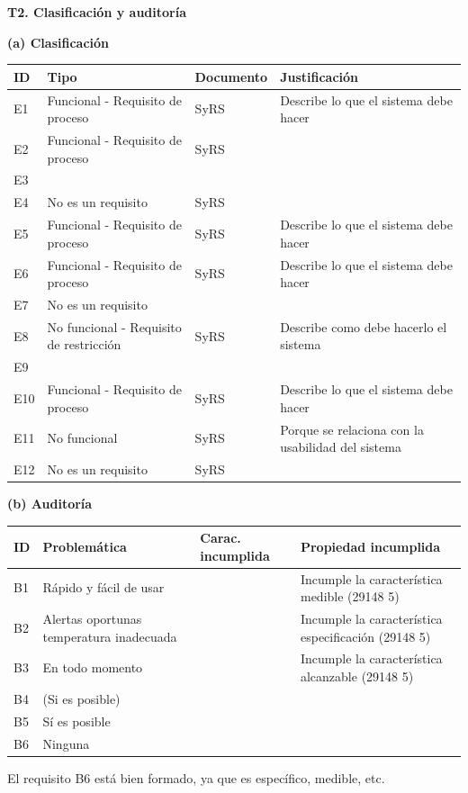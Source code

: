 \documentclass[11pt]{article}
\begin{document}
\begin{cajarespuesta}[title={Respuesta del estudiante: T2}]
	\textbf{T2. Clasificación y auditoría}

	\textbf{(a) Clasificación}

	\medskip
	\begin{tabular}{|l|p{3.9cm}|l|p{6.2cm}|}
	\hline
	ID & Tipo & Documento & Justificación \\
	\hline
	E1 & Funcional - Requisito de proceso & SyRS & Describe lo que el sistema debe hacer \\
	\hline
	E2 & Funcional - Requisito de proceso & SyRS & \\
	\hline
	E3 & & & \\
	\hline
	E4 & No es un requisito & SyRS & \\
	\hline
	E5 & Funcional - Requisito de proceso & SyRS & Describe lo que el sistema debe hacer \\
	\hline
	E6 & Funcional - Requisito de proceso & SyRS & Describe lo que el sistema debe hacer \\
	\hline
	E7 & No es un requisito & & \\
	\hline
	E8 & No funcional - Requisito de restricción & SyRS & Describe como debe hacerlo el sistema \\
	\hline
	E9 & & & \\
	\hline
	E10 & Funcional - Requisito de proceso & SyRS & Describe lo que el sistema debe hacer \\
	\hline
	E11 & No funcional & SyRS & Porque se relaciona con la usabilidad del sistema \\
	\hline
	E12 & No es un requisito & SyRS & \\
	\hline
	\end{tabular}

	\bigskip
	\textbf{(b) Auditoría}

	\medskip
	\begin{tabular}{|l|p{4.2cm}|p{2.2cm}|p{5.2cm}|}
	\hline
	ID & Problemática & Carac. incumplida & Propiedad incumplida \\
	\hline
	B1 & Rápido y fácil de usar & & Incumple la característica medible (29148 5) \\
	\hline
	B2 & Alertas oportunas temperatura inadecuada & & Incumple la característica especificación (29148 5) \\
	\hline
	B3 & En todo momento & & Incumple la característica alcanzable (29148 5) \\
	\hline
	B4 & (Si es posible) & & \\
	\hline
	B5 & Sí es posible & & \\
	\hline
	B6 & Ninguna & & \\
	\hline
	\end{tabular}

	\medskip
	El requisito B6 está bien formado, ya que es específico, medible, etc.
\end{cajarespuesta}
\end{document}
